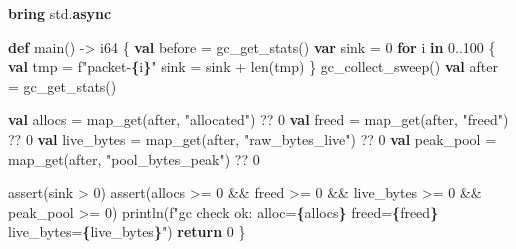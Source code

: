 \documentclass[
  english,
  oneside]{book}
\newenvironment{Shaded}{\begin{snugshade}}{\end{snugshade}}
\newcommand{\ControlFlowTok}[1]{\textcolor[rgb]{0.77,0.53,0.75}{\textbf{#1}}}
\newcommand{\DataTypeTok}[1]{\textcolor[rgb]{0.31,0.79,0.69}{#1}}
\newcommand{\DecValTok}[1]{\textcolor[rgb]{0.71,0.81,0.66}{#1}}
\newcommand{\FunctionTok}[1]{\textcolor[rgb]{0.86,0.86,0.67}{#1}}
\newcommand{\KeywordTok}[1]{\textcolor[rgb]{0.34,0.61,0.84}{\textbf{#1}}}
\newcommand{\NormalTok}[1]{\textcolor[rgb]{0.83,0.83,0.83}{#1}}
\newcommand{\OperatorTok}[1]{\textcolor[rgb]{0.83,0.83,0.83}{#1}}
\newcommand{\StringTok}[1]{\textcolor[rgb]{0.81,0.57,0.47}{#1}}
\begin{document}
\begin{Shaded}
\begin{Highlighting}[]
\KeywordTok{bring}\NormalTok{ std}\OperatorTok{.}\KeywordTok{async}

\KeywordTok{def}\NormalTok{ main() }\OperatorTok{{-}\textgreater{}} \DataTypeTok{i64}\NormalTok{ \{}
    \KeywordTok{val}\NormalTok{ before }\OperatorTok{=}\NormalTok{ gc\_get\_stats()}
    \KeywordTok{var}\NormalTok{ sink }\OperatorTok{=} \DecValTok{0}
    \ControlFlowTok{for}\NormalTok{ i }\ControlFlowTok{in} \DecValTok{0}\OperatorTok{..}\DecValTok{100}\NormalTok{ \{}
        \KeywordTok{val}\NormalTok{ tmp }\OperatorTok{=} \StringTok{f"packet{-}}\ControlFlowTok{\{}\NormalTok{i}\ControlFlowTok{\}}\StringTok{"}
\NormalTok{        sink }\OperatorTok{=}\NormalTok{ sink }\OperatorTok{+} \FunctionTok{len}\NormalTok{(tmp)}
\NormalTok{    \}}
\NormalTok{    gc\_collect\_sweep()}
    \KeywordTok{val}\NormalTok{ after }\OperatorTok{=}\NormalTok{ gc\_get\_stats()}

    \KeywordTok{val}\NormalTok{ allocs }\OperatorTok{=} \FunctionTok{map\_get}\NormalTok{(after, }\StringTok{"allocated"}\NormalTok{) }\OperatorTok{??} \DecValTok{0}
    \KeywordTok{val}\NormalTok{ freed }\OperatorTok{=} \FunctionTok{map\_get}\NormalTok{(after, }\StringTok{"freed"}\NormalTok{) }\OperatorTok{??} \DecValTok{0}
    \KeywordTok{val}\NormalTok{ live\_bytes }\OperatorTok{=} \FunctionTok{map\_get}\NormalTok{(after, }\StringTok{"raw\_bytes\_live"}\NormalTok{) }\OperatorTok{??} \DecValTok{0}
    \KeywordTok{val}\NormalTok{ peak\_pool }\OperatorTok{=} \FunctionTok{map\_get}\NormalTok{(after, }\StringTok{"pool\_bytes\_peak"}\NormalTok{) }\OperatorTok{??} \DecValTok{0}

    \FunctionTok{assert}\NormalTok{(sink }\OperatorTok{\textgreater{}} \DecValTok{0}\NormalTok{)}
    \FunctionTok{assert}\NormalTok{(allocs }\OperatorTok{\textgreater{}=} \DecValTok{0} \OperatorTok{\&\&}\NormalTok{ freed }\OperatorTok{\textgreater{}=} \DecValTok{0} \OperatorTok{\&\&}\NormalTok{ live\_bytes }\OperatorTok{\textgreater{}=} \DecValTok{0} \OperatorTok{\&\&}\NormalTok{ peak\_pool }\OperatorTok{\textgreater{}=} \DecValTok{0}\NormalTok{)}
\NormalTok{    println(}\StringTok{f"gc check ok: alloc=}\ControlFlowTok{\{}\NormalTok{allocs}\ControlFlowTok{\}}\StringTok{ freed=}\ControlFlowTok{\{}\NormalTok{freed}\ControlFlowTok{\}}\StringTok{ live\_bytes=}\ControlFlowTok{\{}\NormalTok{live\_bytes}\ControlFlowTok{\}}\StringTok{"}\NormalTok{)}
    \ControlFlowTok{return} \DecValTok{0}
\NormalTok{\}}
\end{Highlighting}
\end{Shaded}
\end{document}
